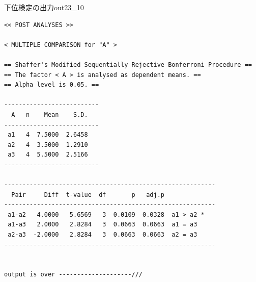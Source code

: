 \begin{Rscreen}{下位検定の出力}{out23_10}

	\begin{verbatim}
<< POST ANALYSES >>

< MULTIPLE COMPARISON for "A" >

== Shaffer's Modified Sequentially Rejective Bonferroni Procedure ==
== The factor < A > is analysed as dependent means. == 
== Alpha level is 0.05. == 
 
--------------------------
  A   n    Mean    S.D. 
--------------------------
 a1   4  7.5000  2.6458 
 a2   4  3.5000  1.2910 
 a3   4  5.5000  2.5166 
--------------------------

----------------------------------------------------------
  Pair     Diff  t-value  df       p   adj.p            
----------------------------------------------------------
 a1-a2   4.0000   5.6569   3  0.0109  0.0328  a1 > a2 * 
 a1-a3   2.0000   2.8284   3  0.0663  0.0663  a1 = a3   
 a2-a3  -2.0000   2.8284   3  0.0663  0.0663  a2 = a3   
----------------------------------------------------------


output is over --------------------///

\end{verbatim}
\end{Rscreen}
